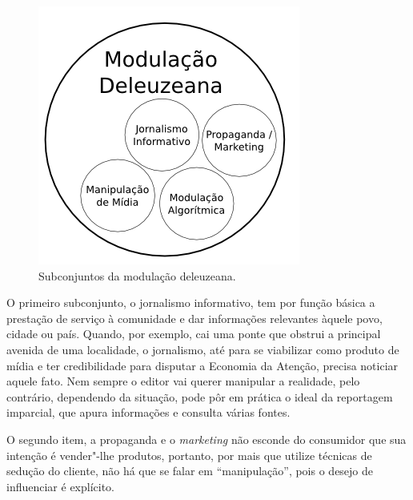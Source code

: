 \begin{figure}[!ht]
\includegraphics[width=\textwidth]{./imgs/grafico2.png}
\caption{\formular\footnotesize{Subconjuntos da modulação deleuzeana.}}
\end{figure}

O primeiro subconjunto, o jornalismo informativo, tem por função básica
a prestação de serviço à comunidade e dar informações relevantes àquele
povo, cidade ou país. Quando, por exemplo, cai uma ponte que obstrui a
principal avenida de uma localidade, o jornalismo, até para se
viabilizar como produto de mídia e ter credibilidade para disputar a
Economia da Atenção, precisa noticiar aquele fato. Nem sempre o editor
vai querer manipular a realidade, pelo contrário, dependendo da
situação, pode pôr em prática o ideal da reportagem imparcial, que apura
informações e consulta várias fontes.

O segundo item, a propaganda e o \emph{marketing} não esconde do
consumidor que sua intenção é vender"-lhe produtos, portanto, por mais
que utilize técnicas de sedução do cliente, não há que se falar em
``manipulação'', pois o desejo de influenciar é explícito.

